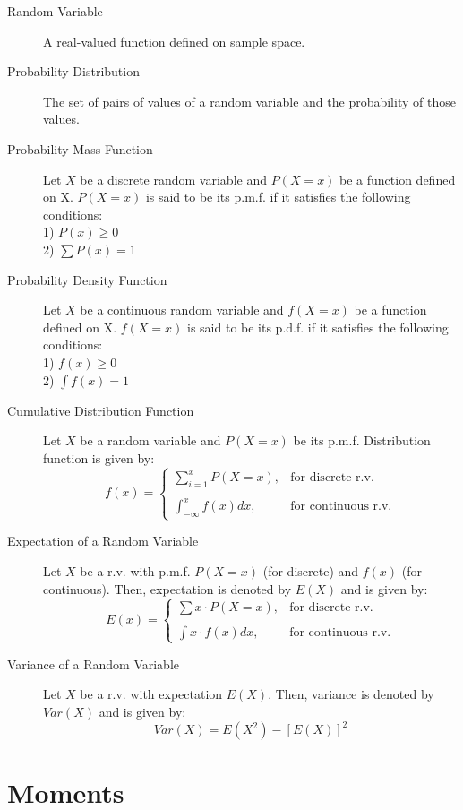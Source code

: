 \documentclass[
10pt, %
a4paper, %
]{report}
\begin{document}
\begin{description}
  \item[Random Variable]
    A real-valued function defined on sample space.
  \item[Probability Distribution]
    The set of pairs of values of a random variable and the probability of those values.
  \item[Probability Mass Function]
    Let \(X\) be a discrete random variable and \(P(X=x)\) be a function defined on X. \(P(X=x)\) is said to be its p.m.f. if it satisfies the following conditions: \\
    1) \(P(x)\geq 0\) \\
    2) \(\sum P(x) = 1\)
  \item[Probability Density Function]
    Let \(X\) be a continuous random variable and \(f(X=x)\) be a function defined on X. \(f(X=x)\) is said to be its p.d.f. if it satisfies the following conditions: \\
    1) \(f(x)\geq 0\) \\
    2) \(\int f(x) = 1\)
  \item[Cumulative Distribution Function]
    Let \(X\) be a random variable and \(P(X=x)\) be its p.m.f. Distribution function is given by:
    \[
    f(x)= 
        \begin{cases}
            \sum_{i=1}^x P(X=x),        & \text{for discrete r.v.} \\ \\
            \int_{-\infty}^x f(x)dx,    & \text{for continuous r.v.}
        \end{cases}
    \]
  \item[Expectation of a Random Variable]
    Let \(X\) be a r.v. with p.m.f. \(P(X=x)\) (for discrete) and \(f(x)\) (for continuous). Then, expectation is denoted by \(E(X)\) and is given by:
    \[
    E(x)= 
        \begin{cases}
            \sum x\cdot P(X=x),    & \text{for discrete r.v.} \\ \\
            \int x\cdot f(x)dx,    & \text{for continuous r.v.}
        \end{cases}
    \]
\item[Variance of a Random Variable]
    Let \(X\) be a r.v. with expectation \(E(X)\). Then, variance is denoted by \(Var(X)\) and is given by:
    \[
    Var(X) = E(X^2)-[E(X)]^2
    \]
\end{description}

\section{Moments}
\end{document}
